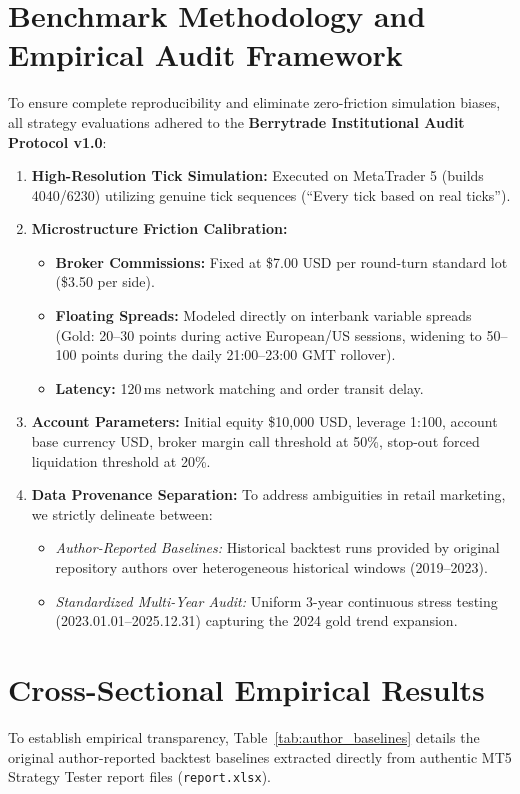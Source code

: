 \documentclass[11pt,a4paper]{article}
\begin{document}
\section{Benchmark Methodology and Empirical Audit Framework}
To ensure complete reproducibility and eliminate zero-friction simulation biases, all strategy evaluations adhered to the \textbf{Berrytrade Institutional Audit Protocol v1.0}:
\begin{enumerate}
    \item \textbf{High-Resolution Tick Simulation:} Executed on MetaTrader 5 (builds 4040/6230) utilizing genuine tick sequences (``Every tick based on real ticks'').
    \item \textbf{Microstructure Friction Calibration:}
    \begin{itemize}
        \item \textbf{Broker Commissions:} Fixed at \$7.00 USD per round-turn standard lot (\$3.50 per side).
        \item \textbf{Floating Spreads:} Modeled directly on interbank variable spreads (Gold: 20--30 points during active European/US sessions, widening to 50--100 points during the daily 21:00--23:00 GMT rollover).
        \item \textbf{Latency:} 120\,ms network matching and order transit delay.
    \end{itemize}
    \item \textbf{Account Parameters:} Initial equity \$10,000 USD, leverage 1:100, account base currency USD, broker margin call threshold at 50\%, stop-out forced liquidation threshold at 20\%.
    \item \textbf{Data Provenance Separation:} To address ambiguities in retail marketing, we strictly delineate between:
    \begin{itemize}
        \item \textit{Author-Reported Baselines:} Historical backtest runs provided by original repository authors over heterogeneous historical windows (2019--2023).
        \item \textit{Standardized Multi-Year Audit:} Uniform 3-year continuous stress testing (2023.01.01--2025.12.31) capturing the 2024 gold trend expansion.
    \end{itemize}
\end{enumerate}

\section{Cross-Sectional Empirical Results}
\label{sec:empirical_results}
To establish empirical transparency, Table~\ref{tab:author_baselines} details the original author-reported backtest baselines extracted directly from authentic MT5 Strategy Tester report files (\texttt{report.xlsx}).
\end{document}
